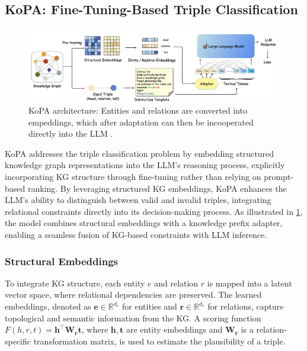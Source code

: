 \documentclass[12pt,a4paper]{article}
\begin{document}
\subsection{KoPA: Fine-Tuning-Based Triple Classification}

\begin{figure}
    \centering
    \includegraphics[width=0.99\textwidth]{figures/KoPAarchitecture}
    \caption{KoPA architecture: Entities and relations are converted into empeddings, which after adaptation can then be incooperated directly into the LLM \cite{qin2023kopa}.}
    \label{fig:KoPAarchitecture}
\end{figure}

KoPA addresses the triple classification problem by embedding structured knowledge graph representations into the LLM’s reasoning process, explicitly incorporating KG structure through fine-tuning rather than relying on prompt-based ranking.
By leveraging structured KG embeddings, KoPA enhances the LLM’s ability to distinguish between valid and invalid triples, integrating relational constraints directly into its decision-making process.
As illustrated in \cref{fig:KoPAarchitecture}, the model combines structural embeddings with a knowledge prefix adapter, enabling a seamless fusion of KG-based constraints with LLM inference.

\subsubsection{Structural Embeddings}
To integrate KG structure, each entity \( e \) and relation \( r \) is mapped into a latent vector space, where relational dependencies are preserved.
The learned embeddings, denoted as \( \mathbf{e} \in \mathbb{R}^{d_e} \) for entities and \( \mathbf{r} \in \mathbb{R}^{d_r} \) for relations, capture topological and semantic information from the KG. A scoring function \( F(h, r, t) = \mathbf{h}^\top \mathbf{W_r} \mathbf{t} \), where \( \mathbf{h}, \mathbf{t} \) are entity embeddings and \( \mathbf{W_r} \) is a relation-specific transformation matrix, is used to estimate the plausibility of a triple.
\end{document}
